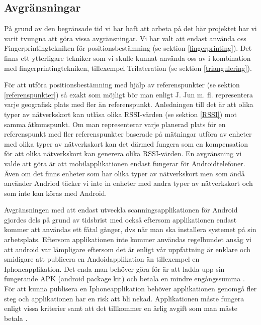 \documentclass[swedish, a4paper,12pt]{article}
\begin{document}
\subsection{Avgränsningar}
På grund av den begränsade tid vi har haft att arbeta på det här projektet har vi varit tvungna att göra vissa avgränsningar.
Vi har valt att endast använda oss Fingerprintingtekniken för positionsbestämning (se sektion \ref{fingerprinting}). Det finns ett ytterligare tekniker som vi skulle kunnat använda oss av i kombination med fingerprintingtekniken, tillexempel Trilateration (se sektion \ref{triangulering}).


För att utföra positionsbestämning med hjälp av referenspunkter (se sektion \ref{referenspunkter}) så exakt som möjligt bör man enligt J. Jun m. fl. representera varje geografisk plats med fler än referenspunkt\cite{jun2018low}.
Anledningen till det är att olika typer av nätverkskort kan utläsa olika RSSI-värden (se sektion \ref{RSSI}) mot samma åtkomspunkt\cite{problem_with_RSSI}. Om man representerar varje planerad plats för en referenspunkt med fler referenspunkter baserade på mätningar utföra av enheter med olika typer av nätverkskort kan det därmed fungera som en kompensation för att olika nätverkskort kan generera olika RSSI-värden\cite{jun2018low}.
En avgränsning vi valde att göra är att mobilapplikationen endast fungerar för Androidtelefoner. Även om det finns enheter som har olika typer av nätverkskort men som ändå använder Andriod täcker vi inte in enheter med andra typer av nätverkskort och som inte kan köras med Android.

 Avgränsningen med att endast utveckla scanningsapplikationen för Android gjordes dels på grund av tidsbrist med också eftersom applikationen endast kommer att användas ett fåtal gånger, dvs när man ska installera systemet på sin arbetsplats. Eftersom applikationen inte kommer användas regelbundet ansåg vi att android var lämpligare eftersom det är enligt vår uppfattning är enklare och smidigare att publicera en Andoidapplikation än tillexempel en Iphoneapplikation. Det enda man behöver göra för är att ladda upp sin fungerande APK (android package kit) och betala en mindre engångssumma \cite{android} \cite{guidePublish}. För att kunna publisera en Iphoneapplikation behöver applikationen genomgå fler steg och applikationen har en risk att bli nekad. Applikationen måste fungera enligt vissa kriterier samt att det tillkommer en årlig avgift som man måste betala \cite{submitIphone} \cite{guidePublish}.
\end{document}
